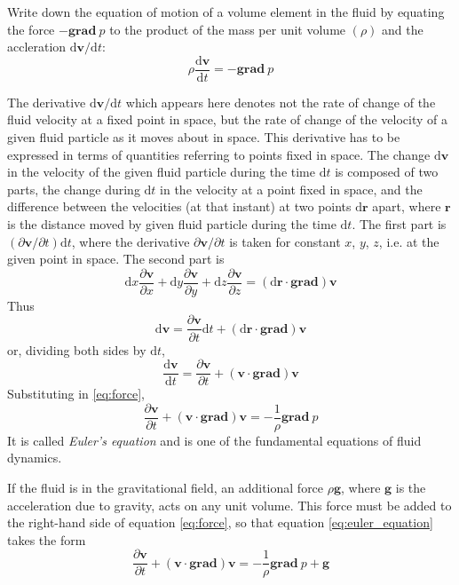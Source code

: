 \documentclass[conference]{IEEEtran}
\theoremstyle{definition}
\theoremstyle{remark}
\begin{document}
    Write down the equation of motion of a volume element in the fluid by equating the force $-\mathbf{grad} \ p$ to the product of the mass per unit volume $(\rho)$ and the accleration $\mathrm{d} \mathbf{v} / \mathrm{d} t$:
    \begin{equation}
        \rho \dfrac{\mathrm{d} \mathbf{v}}{\mathrm{d} t} = -\textbf{grad} \ p
        \label{eq:force}
    \end{equation}

    The derivative $\mathrm{d} \mathbf{v} / \mathrm{d} t$ which appears here denotes not the rate of change of the fluid velocity at a fixed point in space, but the rate of change of the velocity of a given fluid particle as it moves about in space. This derivative has to be expressed in terms of quantities referring to points fixed in space. The change $\mathrm{d} \mathbf{v}$ in the velocity of the given fluid particle during the time $\mathrm{d} t$ is composed of two parts, the change during $\mathrm{d} t$ in the velocity at a point fixed in space, and the difference between the velocities (at that instant) at two points $\mathrm{d} \mathbf{r}$ apart, where $\mathbf{r}$ is the distance moved by given fluid particle during the time $\mathrm{d} t$. The first part is $(\partial \mathbf{v} / \partial t) \mathrm{d} t$, where the derivative $\partial \mathbf{v} / \partial t$ is taken for constant $x$, $y$, $z$, i.e. at the given point in space. The second part is
    \[
        \mathrm{d} x \dfrac{\partial \mathbf{v}}{\partial x} + \mathrm{d} y \dfrac{\partial \mathbf{v}}{\partial y} + \mathrm{d} z \dfrac{\partial \mathbf{v}}{\partial z} = (\mathrm{d} \mathbf{r} \cdot \textbf{grad}) \mathbf{v}
    \]
    Thus
    \[
        \mathrm{d} \mathbf{v} = \dfrac{\partial \mathbf{v}}{\partial t} \mathrm{d} t + (\mathrm{d} \mathbf{r} \cdot \textbf{grad}) \mathbf{v}
    \]
    or, dividing both sides by $\mathrm{d} t$,
    \[
        \dfrac{\mathrm{d} \mathbf{v}}{\mathrm{d} t} = \dfrac{\partial \mathbf{v}}{\partial t} + (\mathbf{v} \cdot \textbf{grad}) \mathbf{v}
    \]
    Substituting in \ref{eq:force},
    \begin{equation}
        \dfrac{\partial \mathbf{v}}{\partial t} + (\mathbf{v} \cdot \textbf{grad}) \mathbf{v} = -\dfrac1\rho \textbf{grad}\ p
        \label{eq:euler_equation}
    \end{equation}
    It is called \emph{Euler's equation} and is one of the fundamental equations of fluid dynamics.

    If the fluid is in the gravitational field, an additional force $\rho \mathbf{g}$, where $\mathbf{g}$ is the acceleration due to gravity, acts on any unit volume. This force must be added to the right-hand side of equation \ref{eq:force}, so that equation \ref{eq:euler_equation} takes the form
    \begin{equation}
        \dfrac{\partial \mathbf{v}}{\partial t} + (\mathbf{v} \cdot \textbf{grad}) \mathbf{v} = -\dfrac1\rho \textbf{grad}\ p + \mathbf{g}
        \label{eq:euler_equation_gravitational}
    \end{equation}
\end{document}
